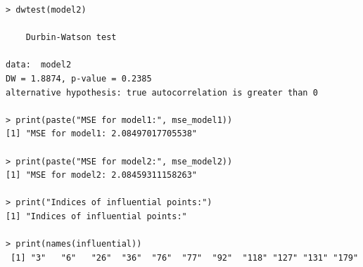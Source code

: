 \documentclass{article}
\begin{document}
\begin{verbatim}
> dwtest(model2)

	Durbin-Watson test

data:  model2
DW = 1.8874, p-value = 0.2385
alternative hypothesis: true autocorrelation is greater than 0

> print(paste("MSE for model1:", mse_model1))
[1] "MSE for model1: 2.08497017705538"

> print(paste("MSE for model2:", mse_model2))
[1] "MSE for model2: 2.08459311158263"

> print("Indices of influential points:")
[1] "Indices of influential points:"

> print(names(influential))
 [1] "3"   "6"   "26"  "36"  "76"  "77"  "92"  "118" "127" "131" "179"

\end{verbatim}
\end{document}
